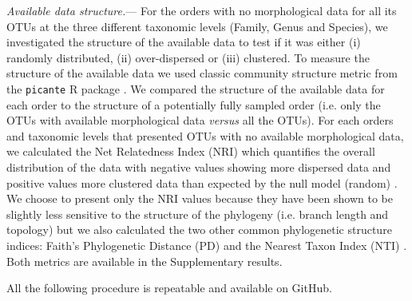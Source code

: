 \documentclass[12pt,letterpaper]{article}
\renewcommand{\subsubsection}[1]{%
\vspace{2ex}
\noindent
\textit{#1.}---}
\begin{document}
\subsubsection{Available data structure}
For the orders with no morphological data for all its OTUs at the three different taxonomic levels (Family, Genus and Species), we investigated the structure of the available data to test if it was either (i) randomly distributed, (ii) over-dispersed or (iii) clustered. To measure the structure of the available data we used classic community structure metric from the \texttt{picante} R package \citep{picante}. We compared the structure of the available data for each order to the structure of a potentially fully sampled order (i.e. only the OTUs with available morphological data \textit{versus} all the OTUs).
For each orders and taxonomic levels that presented OTUs with no available morphological data, we calculated the Net Relatedness Index (NRI) which quantifies the overall distribution of the data with negative values showing more dispersed data and positive values more clustered data than expected by the null model (random) \citep{webb2002phylogenies}. We choose to present only the NRI values because they have been shown to be slightly less sensitive to the structure of the phylogeny (i.e. branch length and topology) \citep{NRI,journal.pone.0004390} but we also calculated the two other common phylogenetic structure indices: Faith's Phylogenetic Distance (PD) \citep{Faith19921} and the Nearest Taxon Index (NTI) \citep{webb2002phylogenies}. Both metrics are available in the Supplementary results.


All the following procedure is repeatable and available on GitHub. %

%
%
\end{document}
